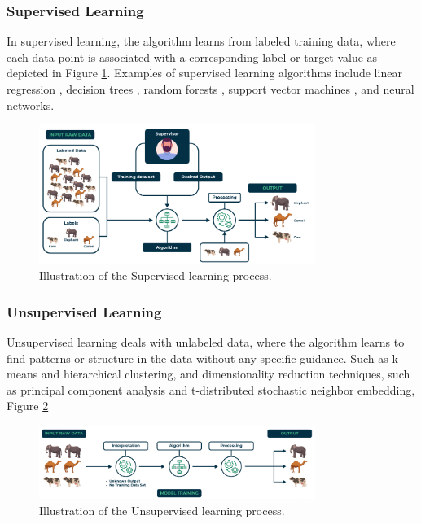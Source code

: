 \subsubsection{Supervised Learning}
In supervised learning, the algorithm learns from labeled training data, where each data point is associated with a corresponding label or target value as depicted in Figure \ref{fig:superml}. Examples of supervised learning algorithms include linear regression , decision trees , random forests , support vector machines , and neural networks.

\begin{figure}[H]
  \centering
  \includegraphics[width=0.8\textwidth]{Images/Chapter1/superml.png}
  \caption{Illustration of the Supervised learning process. \cite{geeksforgeeks2025supervised}}
  \label{fig:superml}
\end{figure}

\subsubsection{Unsupervised Learning}
Unsupervised learning deals with unlabeled data, where the algorithm learns to find patterns or
structure in the data without any specific guidance. Such as k-means and hierarchical
clustering, and dimensionality reduction techniques, such as principal component analysis
and t-distributed stochastic neighbor embedding,  Figure \ref{fig:unsuperml}
\begin{figure}[H]
  \centering
  \includegraphics[width=0.8\textwidth]{Images/Chapter1/unsuperml.png}
  \caption{Illustration of the Unsupervised learning process.\cite{geeksforgeeks2025supervised} }
  \label{fig:unsuperml}
\end{figure}

